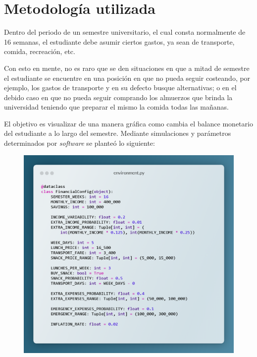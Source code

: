 \documentclass[letterpaper, 11pt]{report}
\begin{document}
\section{Metodología utilizada}

Dentro del periodo de un semestre universitario, el cual consta normalmente de
16 semanas, el estudiante debe asumir ciertos gastos, ya sean de transporte,
comida, recreación, etc.

Con esto en mente, no es raro que se den situaciones en que a mitad de semestre
el estudiante se encuentre en una posición en que no pueda seguir costeando,
por ejemplo, los gastos de transporte y en su defecto busque alternativas; o en
el debido caso en que no pueda seguir comprando los almuerzos que brinda la
universidad teniendo que preparar el mismo la comida todas las mañanas.

El objetivo es visualizar de una manera gráfica como cambia el balance
monetario del estudiante a lo largo del semestre. Mediante simulaciones y
parámetros determinados por \textit{software} se planteó lo siguiente:

\begin{figure}[H]
      \begin{center}
            \includegraphics[width=\linewidth]{./Images/environment_snippet.png}
            \caption{}
      \end{center}
\end{figure}
\end{document}
